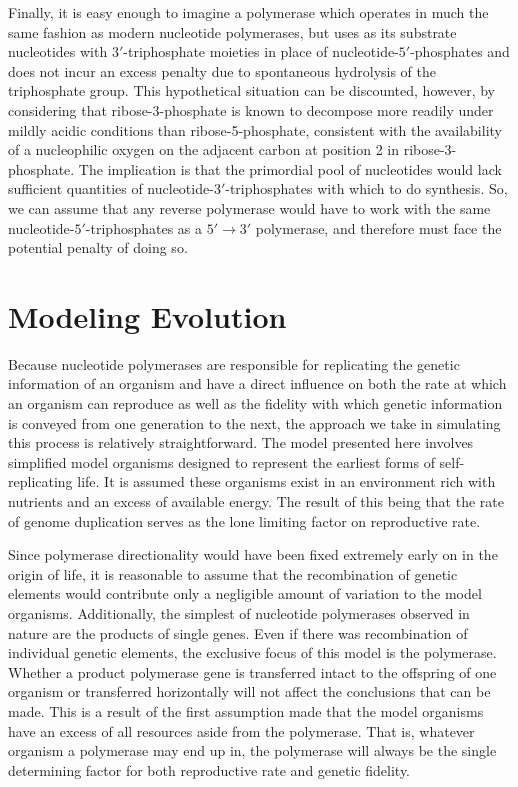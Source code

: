 Finally, it is easy enough to imagine a polymerase which operates in much the same fashion as modern nucleotide polymerases, but uses as its substrate nucleotides with $3'$-triphosphate moieties in place of nucleotide-$5'$-phosphates and does not incur an excess penalty due to spontaneous hydrolysis of the triphosphate group. This hypothetical situation can be discounted, however, by considering that ribose-3-phosphate is known to decompose more readily under mildly acidic conditions than ribose-5-phosphate\cite{Levene:1934p869}, consistent with the availability of a nucleophilic oxygen on the adjacent carbon at position 2 in ribose-3-phosphate. The implication is that the primordial pool of nucleotides would lack sufficient quantities of nucleotide-$3'$-triphosphates with which to do synthesis. So, we can assume that any reverse polymerase would have to work with the same nucleotide-$5'$-triphosphates as a $5'\to3'$ polymerase, and therefore must face the potential penalty of doing so.

\section*{Modeling Evolution} %
\label{sec:modeling_evolution}
Because nucleotide polymerases are responsible for replicating the genetic information of an organism and have a direct influence on both the rate at which an organism can reproduce as well as the fidelity with which genetic information is conveyed from one generation to the next, the approach we take in simulating this process is relatively straightforward. The model presented here involves simplified model organisms designed to represent the earliest forms of self-replicating life. It is assumed these organisms exist in an environment rich with nutrients and an excess of available energy. The result of this being that the rate of genome duplication serves as the lone limiting factor on reproductive rate.

Since polymerase directionality would have been fixed extremely early on in the origin of life, it is reasonable to assume that the recombination of genetic elements would contribute only a negligible amount of variation to the model organisms. Additionally, the simplest of nucleotide polymerases observed in nature are the products of single genes. Even if there was recombination of individual genetic elements, the exclusive focus of this model is the polymerase. Whether a product polymerase gene is transferred intact to the offspring of one organism or transferred horizontally will not affect the conclusions that can be made. This is a result of the first assumption made that the model organisms have an excess of all resources aside from the polymerase. That is, whatever organism a polymerase may end up in, the polymerase will always be the single determining factor for both reproductive rate and genetic fidelity.


